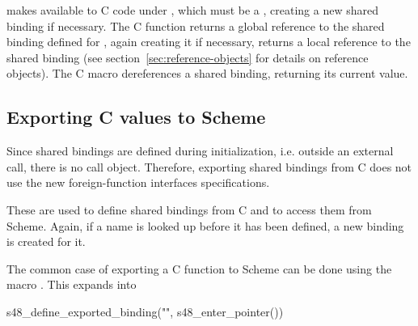 \begin{protos}
\end{protos}

\begin{protos}
\end{protos}

\noindent{} makes  available to C code
under , which must be a , creating a new
shared binding if necessary.  The C function
 returns a global reference to
the shared binding defined for , again creating it if
necessary,  returns a
local reference to the shared binding (see
section~\ref{sec:reference-objects} for details on reference objects).
The C macro  dereferences a shared
binding, returning its current value.

\subsection{Exporting C values to Scheme}

Since shared bindings are defined during initialization, i.e. outside
an external call, there is no call object.  Therefore, exporting
shared bindings from C does not use the new foreign-function
interfaces specifications.

\begin{protos}
\end{protos}

\begin{protos}
\end{protos}

\noindent These are used to define shared bindings from C and to access them
 from Scheme.
Again, if a name is looked up before it has been defined, a new binding is
 created for it.

The common case of exporting a C function to Scheme can be done using
 the macro .
This expands into
\begin{example}
s48\_define\_exported\_binding("",
                               s48\_enter\_pointer())
\end{example}

